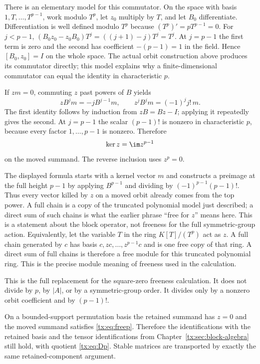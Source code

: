 There is an elementary model for this commutator. On the space with
basis $1,T,\ldots,T^{p-1}$, work modulo $T^p$, let $z_0$ multiply
by $T$, and let $B_0$ differentiate. Differentiation is well defined
modulo $T^p$ because $(T^p)'=pT^{p-1}=0$. For $j<p-1$,
$(B_0z_0-z_0B_0)T^j=((j+1)-j)T^j=T^j$.
At $j=p-1$ the first term is zero and the second has coefficient
$-(p-1)=1$ in the field. Hence $[B_0,z_0]=I$ on the whole space.
The actual orbit construction above produces its commutator directly;
this model explains why a finite-dimensional commutator can equal the
identity in characteristic $p$.

If $zm=0$, commuting $z$ past powers of $B$ yields
\[zB^jm=-jB^{j-1}m,
\qquad z^jB^jm=(-1)^jj!\,m.
\]
The first identity follows by induction from $zB=Bz-I$; applying it repeatedly gives the second. At $j=p-1$ the scalar $(p-1)!$ is nonzero in characteristic $p$, because every factor $1,\ldots,p-1$ is nonzero. Therefore
\begin{equation}\label{tx:eq:freep}\ker z=\im z^{p-1}
\end{equation}
on the moved summand. The reverse inclusion uses $z^p=0$.

The displayed formula starts with a kernel vector $m$ and constructs
a preimage at the full height $p-1$ by applying $B^{p-1}$ and dividing
by $(-1)^{p-1}(p-1)!$. Thus every vector killed by $z$ on a moved
orbit already comes from the top power. A full chain is a copy of
the truncated polynomial model just described; a direct sum of such
chains is what the earlier phrase ``free for $z$'' means here.
This is a statement about the block operator, not freeness for the
full symmetric-group action.
Equivalently, let the variable $T$ in the ring $K[T]/(T^p)$ act
as $z$. A full chain generated by $c$ has basis
$c,zc,\ldots,z^{p-1}c$ and is one free copy of that ring.
A direct sum of full chains is therefore a free module for this
truncated polynomial ring. This is the precise module meaning of
freeness used in the calculation.

This is the full replacement for the square-zero freeness calculation. It does not divide by $p$, by $|A|$, or by a symmetric-group order. It divides only by a nonzero orbit coefficient and by $(p-1)!$.

On a bounded-support permutation basis the retained summand has $z=0$ and the moved summand satisfies \eqref{tx:eq:freep}. Therefore the identifications with the retained basis and the tensor identifications from Chapter~\ref{tx:sec:block-algebra} still hold, with quotient \eqref{tx:eq:Dp}. Stable matrices are transported by exactly the same retained-component argument.

